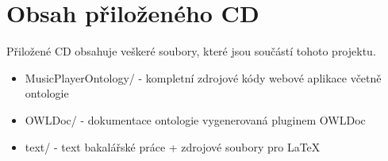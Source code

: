 \chapter{Obsah přiloženého CD}

Přiložené CD obsahuje veškeré soubory, které jsou součástí tohoto projektu.

\begin{itemize}
\item MusicPlayerOntology/ - kompletní zdrojové kódy webové aplikace včetně ontologie
\item OWLDoc/ - dokumentace ontologie vygenerovaná pluginem OWLDoc
\item text/ - text bakalářské práce + zdrojové soubory pro LaTeX
\end{itemize}